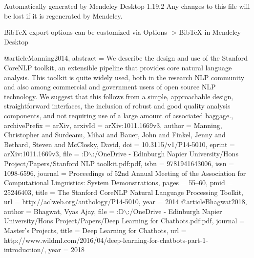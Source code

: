 Automatically generated by Mendeley Desktop 1.19.2
Any changes to this file will be lost if it is regenerated by Mendeley.

BibTeX export options can be customized via Options -> BibTeX in Mendeley Desktop

@article{Manning2014,
abstract = {We describe the design and use of the Stanford CoreNLP toolkit, an extensible pipeline that provides core natural language analysis. This toolkit is quite widely used, both in the research NLP community and also among commercial and government users of open source NLP technology. We suggest that this follows from a simple, approachable design, straightforward interfaces, the inclusion of robust and good quality analysis components, and not requiring use of a large amount of associated baggage.},
archivePrefix = {arXiv},
arxivId = {arXiv:1011.1669v3},
author = {Manning, Christopher and Surdeanu, Mihai and Bauer, John and Finkel, Jenny and Bethard, Steven and McClosky, David},
doi = {10.3115/v1/P14-5010},
eprint = {arXiv:1011.1669v3},
file = {:D$\backslash$:/OneDrive - Edinburgh Napier University/Hons Project/Papers/Stanford NLP toolkit.pdf:pdf},
isbn = {9781941643006},
issn = {1098-6596},
journal = {Proceedings of 52nd Annual Meeting of the Association for Computational Linguistics: System Demonstrations},
pages = {55--60},
pmid = {25246403},
title = {{The Stanford CoreNLP Natural Language Processing Toolkit}},
url = {http://aclweb.org/anthology/P14-5010},
year = {2014}
}
@article{Bhagwat2018,
      author = {Bhagwat, Vyas Ajay},
      file = {:D$\backslash$:/OneDrive - Edinburgh Napier University/Hons Project/Papers/Deep Learning for Chatbots.pdf:pdf},
      journal = {Master's Projects},
      title = {{Deep Learning for Chatbots}},
      url = {http://www.wildml.com/2016/04/deep-learning-for-chatbots-part-1-introduction/},
      year = {2018}
}
